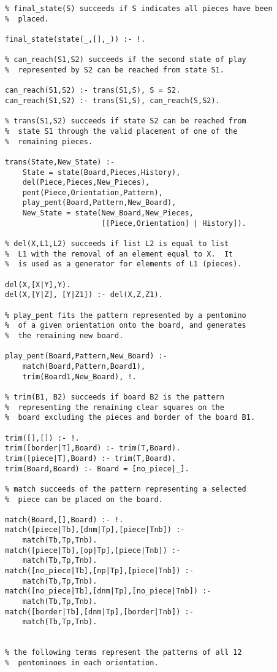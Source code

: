 \begin{verbatim}
% final_state(S) succeeds if S indicates all pieces have been
%  placed.

final_state(state(_,[],_)) :- !.

% can_reach(S1,S2) succeeds if the second state of play
%  represented by S2 can be reached from state S1.

can_reach(S1,S2) :- trans(S1,S), S = S2.
can_reach(S1,S2) :- trans(S1,S), can_reach(S,S2).

% trans(S1,S2) succeeds if state S2 can be reached from 
%  state S1 through the valid placement of one of the
%  remaining pieces.

trans(State,New_State) :-
    State = state(Board,Pieces,History),
    del(Piece,Pieces,New_Pieces),
    pent(Piece,Orientation,Pattern),
    play_pent(Board,Pattern,New_Board),
    New_State = state(New_Board,New_Pieces,
                      [[Piece,Orientation] | History]).

% del(X,L1,L2) succeeds if list L2 is equal to list
%  L1 with the removal of an element equal to X.  It
%  is used as a generator for elements of L1 (pieces).

del(X,[X|Y],Y).
del(X,[Y|Z], [Y|Z1]) :- del(X,Z,Z1).

% play_pent fits the pattern represented by a pentomino
%  of a given orientation onto the board, and generates
%  the remaining new board.

play_pent(Board,Pattern,New_Board) :-
    match(Board,Pattern,Board1),
    trim(Board1,New_Board), !.

% trim(B1, B2) succeeds if board B2 is the pattern
%  representing the remaining clear squares on the
%  board excluding the pieces and border of the board B1.

trim([],[]) :- !.
trim([border|T],Board) :- trim(T,Board).
trim([piece|T],Board) :- trim(T,Board).
trim(Board,Board) :- Board = [no_piece|_].

% match succeeds of the pattern representing a selected
%  piece can be placed on the board.

match(Board,[],Board) :- !.
match([piece|Tb],[dnm|Tp],[piece|Tnb]) :-
    match(Tb,Tp,Tnb).
match([piece|Tb],[op|Tp],[piece|Tnb]) :-
    match(Tb,Tp,Tnb).
match([no_piece|Tb],[np|Tp],[piece|Tnb]) :-
    match(Tb,Tp,Tnb).
match([no_piece|Tb],[dnm|Tp],[no_piece|Tnb]) :-
    match(Tb,Tp,Tnb).
match([border|Tb],[dnm|Tp],[border|Tnb]) :-
    match(Tb,Tp,Tnb).


% the following terms represent the patterns of all 12
%  pentominoes in each orientation.


\end{verbatim}

